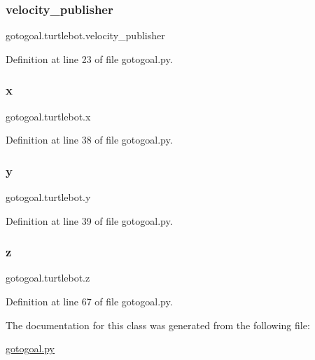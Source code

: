 \subsubsection{\texorpdfstring{velocity\+\_\+publisher}{velocity\_publisher}}
{\footnotesize\ttfamily gotogoal.\+turtlebot.\+velocity\+\_\+publisher\hspace{0.3cm}{\ttfamily [static]}}



Definition at line 23 of file gotogoal.\+py.

\mbox{\label{classgotogoal_1_1turtlebot_ad6b551134c3ffcf8b219a028bd9f6967}} 
\subsubsection{\texorpdfstring{x}{x}}
{\footnotesize\ttfamily gotogoal.\+turtlebot.\+x\hspace{0.3cm}{\ttfamily [static]}}



Definition at line 38 of file gotogoal.\+py.

\mbox{\label{classgotogoal_1_1turtlebot_a323496e4cd69a768268e1d0a11ec03ec}} 
\subsubsection{\texorpdfstring{y}{y}}
{\footnotesize\ttfamily gotogoal.\+turtlebot.\+y\hspace{0.3cm}{\ttfamily [static]}}



Definition at line 39 of file gotogoal.\+py.

\mbox{\label{classgotogoal_1_1turtlebot_ae8b6f9346f749119194f003367d7c3bf}} 
\subsubsection{\texorpdfstring{z}{z}}
{\footnotesize\ttfamily gotogoal.\+turtlebot.\+z\hspace{0.3cm}{\ttfamily [static]}}



Definition at line 67 of file gotogoal.\+py.



The documentation for this class was generated from the following file\+:\begin{DoxyCompactItemize}
\item 
\hyperlink{gotogoal_8py}{gotogoal.\+py}\end{DoxyCompactItemize}
